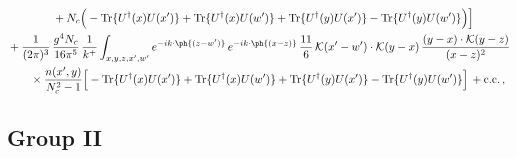 \begin{align}
&\qquad\qquad+N_{c}\Big(-{\rm Tr}\{U^{\dagger}(x)U(x')\}+{\rm Tr}\{U^{\dagger}(x)U(w')\}+{\rm Tr}\{U^{\dagger}(y)U(x')\}-{\rm Tr}\{U^{\dagger}(y)U(w')\}\Big)\Big]\notag\\
&+\frac{1}{(2\pi)^{3}}\,\frac{g^{4}N_{c}}{16\pi^{5}}\,\frac{1}{k^{+}}\int_{x,y,z,x',w'}e^{-ik\cdot\ph{(z-w')}}\,e^{-ik\cdot\ph{(x-z)}}\,\frac{11}{6}\,\mathcal{K}(x'-w')\cdot\mathcal{K}(y-x)\,\frac{(y-x)\cdot\mathcal{K}(y-z)}{(x-z)^{2}}\notag\\
&\qquad\times\frac{n(x',y)}{N_{c}^{2}-1}\Big[-{\rm Tr}\{U^{\dagger}(x)U(x')\}+{\rm Tr}\{U^{\dagger}(x)U(w')\}+{\rm Tr}\{U^{\dagger}(y)U(x')\}-{\rm Tr}\{U^{\dagger}(y)U(w')\}\Big]\,+{\rm c.c.}\,,\label{eq:E-I.V-2o}
\end{align}
\subsection{Group II}
